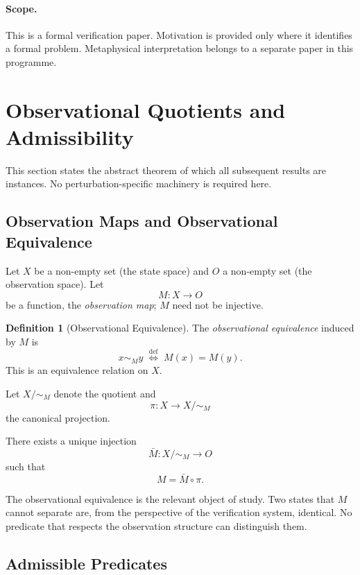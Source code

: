 \documentclass[12pt]{article}
\theoremstyle{plain}
\theoremstyle{definition}
\newtheorem{definition}[theorem]{Definition}
\theoremstyle{remark}
\begin{document}
\paragraph{Scope.}
This is a formal verification paper.
Motivation is provided only where it identifies a formal problem.
Metaphysical interpretation belongs to a separate paper in this
programme.

\section{Observational Quotients and Admissibility}
\label{sec:quotients}

This section states the abstract theorem of which all subsequent
results are instances.
No perturbation-specific machinery is required here.

\subsection{Observation Maps and Observational Equivalence}

Let $X$ be a non-empty set (the state space) and $O$ a non-empty set
(the observation space).
Let
\[
M : X \to O
\]
be a function, the \emph{observation map}; $M$ need not be injective.

\begin{definition}[Observational Equivalence]
The \emph{observational equivalence} induced by $M$ is
\[
x \sim_M y
\;\stackrel{\mathrm{def}}{\iff}\;
M(x) = M(y).
\]
This is an equivalence relation on $X$.

Let $X/{\sim_M}$ denote the quotient and
\[
\pi : X \to X/{\sim_M}
\]
the canonical projection.

There exists a unique injection
\[
\bar{M} : X/{\sim_M} \to O
\]
such that
\[
M = \bar{M} \circ \pi.
\]
\end{definition}

The observational equivalence is the relevant object of study.
Two states that $M$ cannot separate are, from the perspective of the
verification system, identical.
No predicate that respects the observation structure can distinguish
them.

\subsection{Admissible Predicates}
\end{document}
